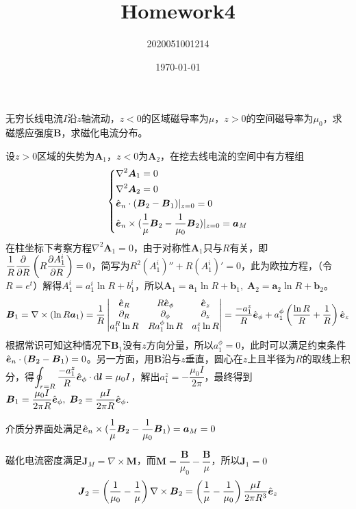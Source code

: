 \documentclass{mynote}
\title{Homework4}
\author{2020051001214}
\date\today
\begin{document}
\maketitle




\begin{exercise}{3.3}
    无穷长线电流$I$沿$z$轴流动，$z<0$的区域磁导率为$\mu$，$z>0$的空间磁导率为$\mu_0$，求磁感应强度$\bm{B}$，求磁化电流分布。
\end{exercise}
\begin{solution}
设$z>0$区域的失势为$\bm{A}_1$，$z<0$为$\bm{A}_2$，在挖去线电流的空间中有方程组
\[
\left\{
    \begin{aligned}
        & \nabla^2 \boldsymbol{A}_1 = 0\\
        & \nabla^2 \boldsymbol{A}_2 = 0 \\
        & \hat{\boldsymbol{e}}_n \cdot (\boldsymbol{B}_2 - \boldsymbol{B}_1) |_{z=0}= 0 \\
        & \hat{\boldsymbol{e}}_n \times (\dfrac{1}{\mu} \boldsymbol{B}_2 - \dfrac{1}{\mu_0} \boldsymbol{B}_2) |_{z=0} = \boldsymbol{a}_M
    \end{aligned} 
\right.    
\]
在柱坐标下考察方程$ \nabla^2 \bm{A}_1 = 0$，由于对称性$\bm{A}_1$只与$R$有关，即$\dfrac{1}{R} \dfrac{\partial }{\partial R} \left( R \dfrac{\partial A_1^{i}}{\partial R} \right) = 0$，简写为$R^2(A_1^{i})'' + R(A_1^{i}) ' = 0 $，此为欧拉方程，（令$R = e^t$）解得$A_1^i = a_1^i \ln R + b_1^i$，所以$\bm{A}_1 = \bm{a}_1 \ln R + \bm{b}_1,\; \bm{A}_2 = \bm{a}_2 \ln R + \bm{b}_2$。
\[
\boldsymbol{B}_1 = \nabla \times (\ln R \boldsymbol{a}_1) = \dfrac{1}{R} \left| \begin{matrix}
    \hat{\boldsymbol{e}}_R & R\hat{\boldsymbol{e}}_{\phi} & \hat{\boldsymbol{e}}_z \\
    \partial_R & \partial_{\phi} & \partial_{z} \\
    a_1^R \ln R &R a_1^{\phi} \ln R & a_1^z \ln R
\end{matrix} \right|    = \frac{-a_1^{z}}{R} \hat{\boldsymbol{e}}_{\phi} + a_1^{\phi} \left( \frac{\ln R}{R} + \frac{1}{R} \right) \hat{\boldsymbol{e}}_z
\]
根据常识可知这种情况下$\bm{B}_1$没有$z$方向分量，所以$a_1^{\phi} = 0$，此时可以满足约束条件$\hat{\boldsymbol{e}}_n \cdot (\boldsymbol{B}_2 - \boldsymbol{B}_1) = 0$。另一方面，用$\bm{B}$沿与$z$垂直，圆心在$z$上且半径为$R$的取线上积分，得$\displaystyle\oint_{r=R} \frac{-a_1^{z}}{R} \hat{\boldsymbol{e}}_{\phi} \cdot \mathop{}\!\mathrm{d} \boldsymbol{l} = \mu_0 I$，解出$a_1^z = -\dfrac{\mu_0 I}{2 \pi}$，最终得到$\boldsymbol{B}_1 = \dfrac{\mu_0 I}{2 \pi R} \hat{\boldsymbol{e}}_{\phi},\; \boldsymbol{B}_2 = \dfrac{\mu I}{2 \pi R} \hat{\boldsymbol{e}}_{\phi}$.


介质分界面处满足$\hat{\boldsymbol{e}}_n \times (\dfrac{1}{\mu} \boldsymbol{B}_2 - \dfrac{1}{\mu_0} \boldsymbol{B}_1) = \boldsymbol{a}_M = 0$

磁化电流密度满足$\bm{J}_M = \nabla \times \bm{M}$，而$\bm{M} = \dfrac{\bm{B}}{\mu_0} - \dfrac{\bm{B}}{\mu}$，所以$\bm{J}_1 = 0$
\[
\boldsymbol{J}_2 = \left( \frac{1}{\mu_0} - \frac{1}{\mu} \right) \nabla \times \boldsymbol{B}_2 = \left( \frac{1}{\mu} - \frac{1}{\mu_0} \right)\frac{\mu I}{2\pi R^3} \hat{\boldsymbol{e}}_z    
\]

\end{solution}
\end{document}

